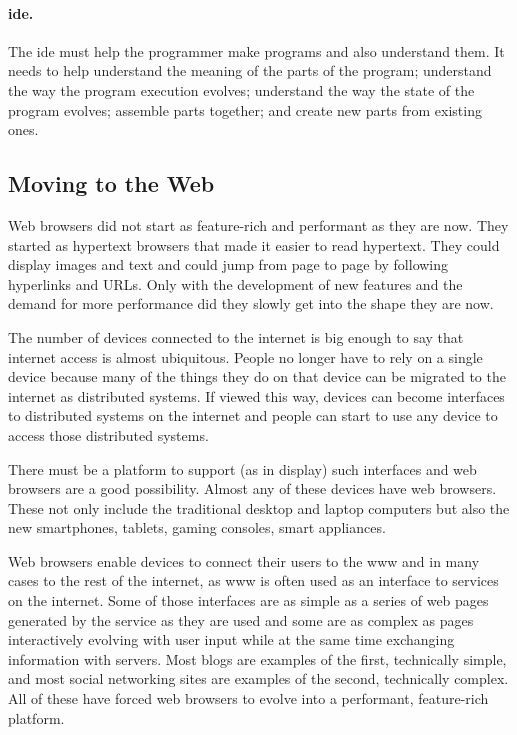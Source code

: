 \documentclass{./llncs2e/llncs}
\begin{document}
	\paragraph{\ac{ide}.}
	The \ac{ide} must help the programmer make programs and also understand them.
	It needs to help understand the meaning of the parts of the program; understand the way the program execution evolves; understand the way the state of the program evolves; assemble parts together; and create new parts from existing ones.


\subsection{Moving to the Web}
	Web browsers did not start as feature-rich and performant as they are now.
	They started as hypertext browsers that made it easier to read hypertext.
	They could display images and text and could jump from page to page by following hyperlinks and URLs.
	Only with the development of new features and the demand for more performance did they slowly get into the shape they are now.

	The number of devices connected to the internet is big enough to say that internet access is almost ubiquitous.
	People no longer have to rely on a single device because many of the things they do on that device can be migrated to the internet as distributed systems.
	If viewed this way, devices can become interfaces to distributed systems on the internet and people can start to use any device to access those distributed systems.

	There must be a platform to support (as in display) such interfaces and web browsers are a good possibility.
	Almost any of these devices have web browsers.
	These not only include the traditional desktop and laptop computers but also the new smartphones, tablets, gaming consoles, smart appliances.

	Web browsers enable devices to connect their users to the \ac{www} and in many cases to the rest of the internet, as \ac{www} is often used as an interface to services on the internet.
	Some of those interfaces are as simple as a series of web pages generated by the service as they are used and some are as complex as pages interactively evolving with user input while at the same time exchanging information with servers.
	Most blogs are examples of the first, technically simple, and most social networking sites are examples of the second, technically complex.
	All of these have forced web browsers to evolve into a performant, feature-rich platform.
\end{document}
